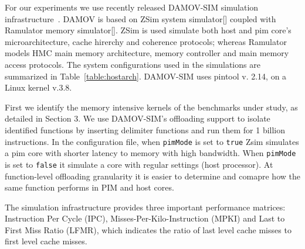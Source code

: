 



For our experiments we use recently released DAMOV-SIM simulation infrastructure~\cite{71}. DAMOV is based on ZSim system simulator[] coupled with Ramulator memory simulator[]. ZSim is used simulate both host and pim core's microarchitecture, cache hirerchy and coherence protocols; whereas Ramulator models HMC main memory architecture, memory controller and main memory access protocols. The system configurations used in the simulations are summarized in Table~\ref{table:hostarch}. DAMOV-SIM uses pintool v. 2.14, on a Linux kernel v.3.8.  

First we identify the memory intensive kernels of the benchmarks under study, as detailed in Section 3. We use DAMOV-SIM's offloading support to isolate identified functions by inserting delimiter functions and run them for 1 billion instructions. In the configuration file, when \texttt{pimMode} is set to \texttt{true} Zsim simulates a pim core with shorter latency to memory with high bandwidth. When \texttt{pimMode} is set to \texttt{false} it simulate a core with regular settings (host processor). At function-level offloading granularity it is easier to determine and comapre how the same function performs in PIM and host cores. %

The simulation infrastructure provides three important performance matrices: Instruction Per Cycle (IPC), Misses-Per-Kilo-Instruction (MPKI) and Last to First Miss Ratio (LFMR), which indicates the ratio of last level cache misses to first level cache misses.    










